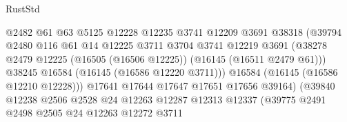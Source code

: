 \begin{lexlean}{RustStd}
\begin{coremodule}
                                        @2482
                                        @61
                                        @63
                                        @5125
                                        @12228
                                        @12235
                                        @3741
                                        @12209
                                        @3691
                                        @38318
                                        (@39794
                                          @2480
                                          @116
                                          @61
                                          @14
                                          @12225
                                          @3711
                                          @3704
                                          @3741
                                          @12219
                                          @3691
                                          (@38278
                                            @2479
                                            @12225
                                            (@16505 (@16506 @12225))
                                            (@16145 (@16511 @2479 @61)))
                                          @38245
                                          @16584
                                          (@16145 (@16586 @12220 @3711)))
                                        @16584
                                        (@16145 (@16586 @12210 @12228)))
                                      @17641
                                      @17644
                                      @17647
                                      @17651
                                      @17656
                                      @39164)
                                    (@39840
                                      @12238
                                      @2506
                                      @2528
                                      @24
                                      @12263
                                      @12287
                                      @12313
                                      @12337
                                      (@39775
                                        @2491
                                        @2498
                                        @2505
                                        @24
                                        @12263
                                        @12272
                                        @3711

\end{coremodule}
\end{lexlean}
